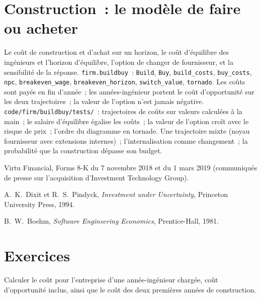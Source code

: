 \section{Construction~: le modèle de faire ou acheter}\label{bld:fm:build-against-buy:buildbuy}

\begin{build}
 Le coût de construction et d'achat sur un horizon, le coût d'équilibre des ingénieurs et l'horizon d'équilibre, l'option de changer de fournisseur, et
la sensibilité de la réponse.
 \texttt{firm.buildbuy}~: \texttt{Build}, \texttt{Buy}, \texttt{build\_costs}, \texttt{buy\_costs}, \texttt{npc},
\texttt{breakeven\_wage}, \texttt{breakeven\_horizon}, \texttt{switch\_value}, \texttt{tornado}.
 Les coûts sont payés en fin d'année~; les années-ingénieur portent le coût d'opportunité sur les deux trajectoires~; la valeur de l'option n'est jamais négative.
 \texttt{code/firm/buildbuy/tests/}~: trajectoires de coûts sur valeurs calculées à la main~; le salaire d'équilibre égalise les coûts~; la valeur de l'option
croît avec le risque de prix~; l'ordre du diagramme en tornade.
 Une trajectoire mixte (noyau fournisseur avec extensions internes)~; l'internalisation comme changement~; la probabilité que la construction dépasse son budget.
\end{build}

\begin{omsources}
\item Virtu Financial, Forms 8-K du 7 novembre 2018 et du 1 mars 2019 (communiqués de presse sur l'acquisition d'Investment Technology Group).
\item A.~K.~Dixit et R.~S.~Pindyck, \emph{Investment under Uncertainty}, Princeton University Press, 1994.
\item B.~W.~Boehm, \emph{Software Engineering Economics}, Prentice-Hall, 1981.
\end{omsources}

\section{Exercices}

\begin{exercise}[$\star$]\label{exo:fm:build-against-buy:1}
Calculer le coût pour l'entreprise d'une année-ingénieur chargée, coût d'opportunité inclus, ainsi que le coût des deux premières années de construction.
\end{exercise}

